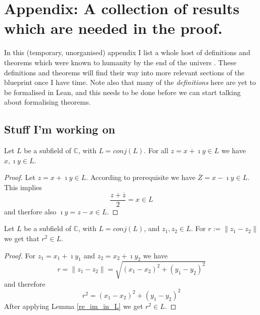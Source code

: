 \chapter{Appendix: A collection of results which are needed in the proof.}
\label{ch_bestiary}
In this (temporary, unorganised) appendix I list a whole host of definitions and theorems which were known to humanity by the end of the univers \cite{JAN_SCHRÖER:2023}. These definitions and theorems will find their way into more relevant sections of the blueprint once I have time. Note also that many of the \emph{definitions} here are yet to be formalised in Lean, and this needs to be done before we can start talking about formalising theorems.


\section*{Stuff I'm working on}




\begin{lemma}
    \label{re_im_in_L}
    Let $L$ be a subfield of $\mathbb{C}$, with $L = conj(L)$. For all $z = x + \imath y \in L$ we have $x, \imath y \in L$.
\end{lemma}
\begin{proof}
    Let $z = x + \imath y \in L$. According to prerequisite we have $\overline{Z}=x-\imath y \in L$. This implies
    \begin{equation*}
        \frac{z + \overline{z}}{2} = x \in L
    \end{equation*}
    and therfore also $\imath y = z - x \in L$.
\end{proof}

\begin{lemma}
    \label{dist_sqard_in_L}
    Let $L$ be a subfield of $\mathbb{C}$, with $L = conj(L)$, and $z_1, z_2 \in L$.
    For $r := \|z_1-z_2\|$ we get that $r^2 \in L$.
\end{lemma}
\begin{proof}
    For $z_1 = x_1 + \imath y_1$ and $z_2 = x_2 + \imath y_2$ we have
    \begin{equation*}
        r = \|z_1 - z_2\| = \sqrt{(x_1 - x_2)^2 + (y_1 - y_2)^2}
    \end{equation*}
    and therefore
    \begin{equation*}
        r^2 = (x_1 - x_2)^2 + (y_1 - y_2)^2 
    \end{equation*}
    After applying Lemma \ref{re_im_in_L} we get $r^2 \in L$.
\end{proof}

